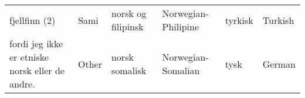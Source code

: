 \begin{table}[H]
{\begin{tabular}{|ll|ll|ll|}
fjellfinn (2)                                   & Sami                               & norsk og filipinsk                        & Norwegian-Philipine                & tyrkisk                         & Turkish                           \\
fordi jeg ikke er etniske norsk eller de andre. & Other                              & norsk somalisk                            & Norwegian-Somalian                 & tysk                            & German                             \\ \hline
	\end{tabular}

    }

    \label{table:Table_Etnicities}

\end{table}



